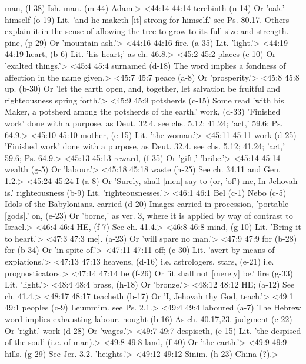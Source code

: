   man, (l-38)  Ish.
  man. (m-44)  Adam.>
<44:14 44:14  terebinth (n-14)  Or 'oak.'
  himself (o-19)  Lit. 'and he maketh [it] strong for himself.' see Ps. 80.17.  Others explain it in the sense of allowing the tree to grow to  its full size and strength.
  pine, (p-29)  Or 'mountain-ash.'>
<44:16 44:16  fire. (a-35)  Lit. 'light.'>
<44:19 44:19  heart, (b-6)  Lit. 'his heart;' as ch. 46.8.>
<45:2 45:2  places (c-10)  Or 'exalted things.'>
<45:4 45:4  surnamed (d-18)  The word implies a fondness of affection in the name given.>
<45:7 45:7  peace (a-8)  Or 'prosperity.'>
<45:8 45:8  up. (b-30)  Or 'let the earth open, and, together, let salvation be  fruitful and righteousness spring forth.'>
<45:9 45:9  potsherds (c-15)  Some read 'with his Maker, a potsherd among the potsherds of  the earth.'
  work, (d-33)  'Finished work' done with a purpose, as Deut. 32.4. see chs. 5.12; 41.24; 'act,' 59.6; Ps. 64.9.>
<45:10 45:10  mother, (e-15)  Lit. 'the woman.'>
<45:11 45:11  work (d-25)  'Finished work' done with a purpose, as Deut. 32.4. see chs.  5.12; 41.24; 'act,' 59.6; Ps. 64.9.>
<45:13 45:13  reward, (f-35)  Or 'gift,' 'bribe.'>
<45:14 45:14  wealth (g-5)  Or 'labour.'>
<45:18 45:18  waste (h-25)  See ch. 34.11 and Gen. 1.2.>
<45:24 45:24  I (a-8)  Or 'Surely, shall [men] say to (or, 'of') me, In Jehovah is.'
  righteousness (b-9)  Lit. 'righteousnesses.'>
<46:1 46:1  Bel (c-1)  Nebo (c-5)
  Idols of the Babylonians.
  carried (d-20)  Images carried in procession, 'portable [gods].'
  on, (e-23)  Or 'borne,' as ver. 3, where it is applied by way of contrast  to Israel.>
<46:4 46:4  HE, (f-7)  See ch. 41.4.>
<46:8 46:8  mind, (g-10)  Lit. 'Bring it to heart.'>
<47:3 47:3  me]. (a-23)  Or 'will spare no man.'>
<47:9 47:9  for (b-28)  for (b-34)
  Or 'in spite of.'>
<47:11 47:11  off; (c-30)  Lit. 'avert by means of expiations.'>
<47:13 47:13  heavens, (d-16)  i.e. astrologers.
  stars, (e-21)  i.e. prognosticators.>
<47:14 47:14  be (f-26)  Or 'it shall not [merely] be.'
  fire (g-33)  Lit. 'light.'>
<48:4 48:4  brass, (h-18)  Or 'bronze.'>
<48:12 48:12  HE; (a-12)  See ch. 41.4.>
<48:17 48:17  teacheth (b-17)  Or 'I, Jehovah thy God, teach.'>
<49:1 49:1  peoples (c-9)  Leummim. see Ps. 2.1.>
<49:4 49:4  laboured (a-7)  The Hebrew word implies exhausting labour.
  nought (b-16)  As ch. 40.17,23.
  judgment (c-22)  Or 'right.'
  work (d-28)  Or 'wages.'>
<49:7 49:7  despiseth, (e-15)  Lit. 'the despised of the soul' (i.e. of man).>
<49:8 49:8  land, (f-40)  Or 'the earth.'>
<49:9 49:9  hills. (g-29)  See Jer. 3.2. 'heights.'>
<49:12 49:12  Sinim. (h-23)  China (?).>
